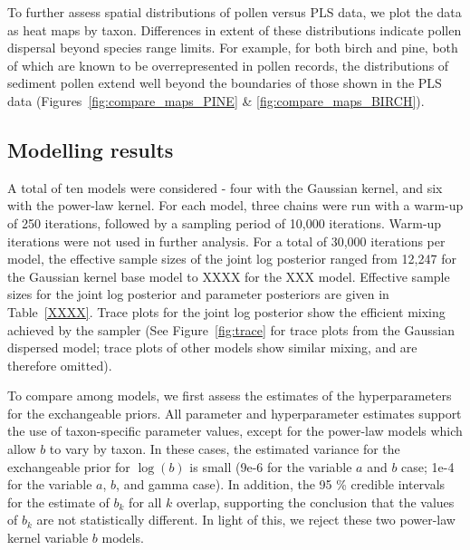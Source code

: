 \documentclass[12pt]{article}
\begin{document}
To further assess spatial distributions of pollen versus PLS data, we
plot the data as heat maps by taxon. Differences in extent of these
distributions indicate pollen dispersal beyond species range
limits. For example, for both birch and pine, both of which are known
to be overrepresented in pollen records, the distributions of sediment
pollen extend well beyond the boundaries of those shown in the PLS
data (Figures~\ref{fig:compare_maps_PINE} \&
\ref{fig:compare_maps_BIRCH}).

\subsection{Modelling results}

A total of ten models were considered - four with the Gaussian kernel,
and six with the power-law kernel. For each model, three chains were
run with a warm-up of 250 iterations, followed by a sampling period of
10,000 iterations. Warm-up iterations were not used in further
analysis. For a total of 30,000 iterations per model, the effective
sample sizes of the joint log posterior ranged from 12,247 for the
Gaussian kernel base model to XXXX for the XXX model. Effective sample
sizes for the joint log posterior and parameter posteriors are given
in Table~\ref{XXXX}. Trace plots for the joint log posterior show the
efficient mixing achieved by the sampler (See Figure~\ref{fig:trace}
for trace plots from the Gaussian dispersed model; trace plots of
other models show similar mixing, and are therefore omitted).

To compare among models, we first assess the estimates of the
hyperparameters for the exchangeable priors. All parameter and
hyperparameter estimates support the use of taxon-specific parameter
values, except for the power-law models which allow $b$ to vary by
taxon. In these cases, the estimated variance for the exchangeable
prior for $\log ( b )$ is small (9e-6 for the variable $a$ and $b$ case;
1e-4 for the variable $a$, $b$, and gamma case). In addition, the 95 \%
credible intervals for the estimate of $b_k$ for all $k$ overlap,
supporting the conclusion that the values of $b_k$ are not
statistically different. In light of this, we reject these two
power-law kernel variable $b$ models. 
\end{document}
